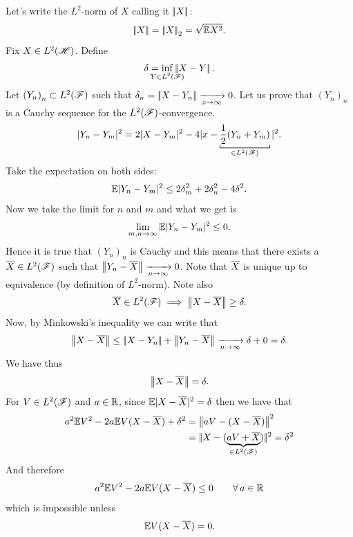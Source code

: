 \documentclass{report}
\begin{document}
\begin{fancyproof}
	Let's write the $L^{2}$-norm of $X$ calling it $\left|\negthinspace\left|X\right|\negthinspace\right|$:
	\begin{equation*}
		\left|\negthinspace\left|X\right|\negthinspace\right|=\left|\negthinspace\left|X\right|\negthinspace\right|_{2}=\sqrt{\mathbb{E} X^{2}}.
	\end{equation*}
	Fix $X\in L^{2}(\mathscr{H})$. Define 
	\begin{equation*}
		\delta=\inf_{\mathclap{Y\in L^{2}(\F)}}\norm{X-Y}.
	\end{equation*}
	Let ${(Y_{n})}_{n}\subset L^{2}(\mathscr{F})$ such that $\delta_n=\left|\negthinspace\left|X-Y_{n}\right|\negthinspace\right|\xrightarrow[x\to\infty]{}0$. Let us prove that ${(Y_{n})}_{n}$ is a Cauchy sequence for the $L^{2}(\mathscr{F})$-convergence.
	\begin{equation*}
		|Y_n-Y_m|^{2}=2|X-Y_{m}|^{2}-4|x-\underbracket[0.6pt]{\frac{1}{2}(Y_{n}+Y_{m})}_{\in L^{2}(\F)}|^{2}.
	\end{equation*}
	Take the expectation on both sides:
	\begin{equation*}
		\mathbb{E}	|Y_n-Y_m|^{2}\leq2\delta^{2}_{m}+2\delta_n^{2}-4\delta^{2}.
	\end{equation*}
	Now we take the limit for $n$ and $m$ and what we get is
	\[\lim_{m,n\to\infty}\mathbb{E}|Y_{n}-Y_{m}|^{2}\leq 0.\]
	Hence it is true that ${(Y_{n})}_{n}$ is Cauchy and this means that there exists a $\overline{X}\in L^{2}(\mathscr{F})$ such that $\left|\negthinspace\left|Y_{n}-\overline{X}\right|\negthinspace\right|\xrightarrow[n\to\infty]{}0$. Note that $\overline{X}$ is unique up to equivalence (by definition of $L^{2}$-norm). Note also
	\begin{equation*}
		\overline{X}\in L^{2}(\mathscr{F})\implies \left|\negthinspace\left|X-\overline{X}\right|\negthinspace\right|\geq \delta.
	\end{equation*}
	Now, by Minkowski's inequality we can write that
	\begin{equation*}
		\left|\negthinspace\left|X-\overline{X}\right|\negthinspace\right|\leq\left|\negthinspace\left|X-Y_{n}\right|\negthinspace\right|+\left|\negthinspace\left|Y_n-\overline{X}\right|\negthinspace\right|\xrightarrow[n\to\infty]{}\delta+0=\delta.
	\end{equation*}
	We have thus 
	\begin{equation*}
		\left|\negthinspace\left|X-\overline{X}\right|\negthinspace\right|=\delta.
	\end{equation*}
	For $V\in L^{2}(\mathscr{F})$ and $a\in\mathbb{R}$, since $\mathbb{E}|X-\overline{X}|^{2}=\delta$ then we have that
	\begin{align*}
		a^{2}\mathbb{E} V^{2}-2a\mathbb{E} V(X-\overline{X})+\delta^{2}&=\left|\negthinspace\left|aV-(X-\overline{X})\right|\negthinspace\right|^{2}\\
		&=|\negthinspace|X-(\underbrace{aV+\overline{X}}_{\in L^{2}(\mathscr{F})})|\negthinspace|^{2}=\delta^{2}
	\end{align*}
	And therefore 
	\begin{equation*}
		a^{2}\mathbb{E} V^{2}-2a\mathbb{E} V(X-\overline{X})\leq 0\qquad\forall\, a\in\mathbb{R}
	\end{equation*} which is impossible unless
	\[\mathbb{E} V(X-\overline{X})=0.\]
\end{fancyproof}
\end{document}
